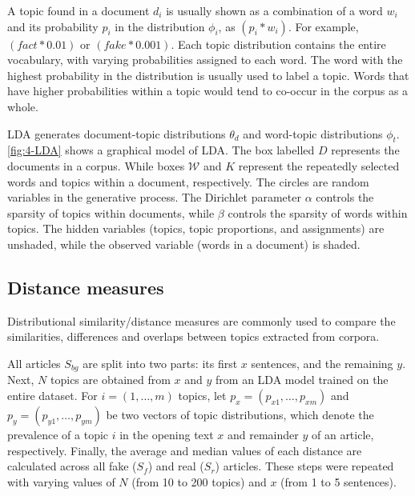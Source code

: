 A topic found in a document $d_i$ is usually shown as a combination of a word $w_i$ and its probability $p_i$ in the distribution $\phi_i$, as $(p_i \ast w_i)$. For example, $(fact \ast 0.01)$ or $(fake \ast 0.001)$. Each topic distribution contains the entire vocabulary, with varying probabilities assigned to each word. The word with the highest probability in the distribution is usually used to label a topic. Words that have higher probabilities within a topic would tend to co-occur in the corpus as a whole.

\ac{LDA} generates document-topic distributions $\theta_d$ and word-topic distributions $\phi_t$. \autoref{fig:4-LDA} shows a graphical model of \ac{LDA}. The box labelled $D$ represents the documents in a corpus. While boxes $\mathscr{W}$ and $K$ represent the repeatedly selected words and topics within a document, respectively. The circles are random variables in the generative process. The Dirichlet parameter $\alpha$  controls the sparsity of topics within documents, while $\beta$ controls the sparsity of words within topics. The hidden variables (topics, topic proportions, and assignments) are unshaded, while the observed variable (words in a document) is shaded.

\subsection{Distance measures}
\label{ssec:4-LDA}

Distributional similarity/distance measures are commonly used to compare the similarities, differences and overlaps between topics extracted from corpora.

All articles $S_{bg}$ are split into two parts: its first $x$ sentences, and the remaining $y$. Next, $N$ topics are obtained from $x$ and $y$ from an \ac{LDA} model trained on the entire dataset. For $i = (1, \ldots, m)$ topics, let $p_x = (p_{x1}, \ldots, p_{xm})$ and $p_y = (p_{y1}, \ldots, p_{ym})$ be two vectors of topic distributions, which denote the prevalence of a topic $i$ in the opening text $x$ and remainder $y$ of an article, respectively. Finally, the average and median values of each distance are calculated across all fake ($S_f$) and real ($S_r$) articles. These steps were repeated with varying values of $N$ (from 10 to 200 topics) and $x$ (from 1 to 5 sentences).

